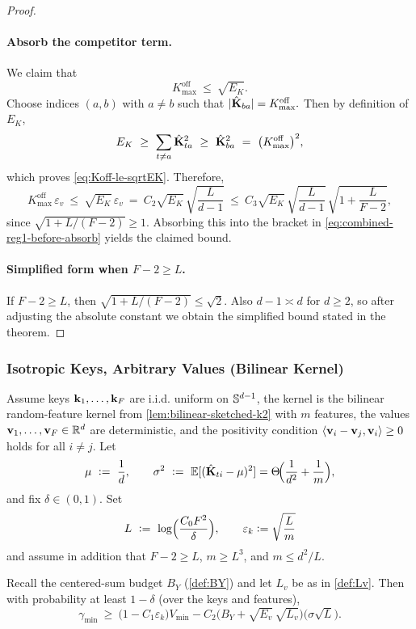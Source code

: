 \begin{proof}
\paragraph{Absorb the competitor term.}
We claim that
\begin{equation}
K_{\max}^{\mathrm{off}}\ \le\ \sqrt{E_K}.
\label{eq:Koff-le-sqrtEK}
\end{equation}
Choose indices \((a,b)\) with \(a\neq b\) such that
\(
|\hat{\mathbf{K}}_{ba}|=K_{\max}^{\mathrm{off}}.
\)
Then by definition of \(E_{K}\),
\[
E_{K}
\ \ge\
\sum_{t\neq a}\hat{\mathbf{K}}_{ta}^2
\ \ge\
\hat{\mathbf{K}}_{ba}^2
\ =\
\big(K_{\max}^{\mathrm{off}}\big)^2,
\]
which proves \eqref{eq:Koff-le-sqrtEK}.
Therefore,
\[
K_{\max}^{\mathrm{off}}\,\varepsilon_{v}
\ \le\
\sqrt{E_K}\,\varepsilon_{v}
\ =\
C_{2}\sqrt{E_K}\,\sqrt{\frac{L}{d-1}}
\ \le\
C_{3}\sqrt{E_K}\,\sqrt{\frac{L}{d-1}}\,\sqrt{1+\frac{L}{F-2}},
\]
since \(\sqrt{1+L/(F-2)}\ge 1\).
Absorbing this into the bracket in \eqref{eq:combined-reg1-before-absorb} yields the claimed bound.

\paragraph{Simplified form when \(F-2\ge L\).}
If \(F-2\ge L\), then \(\sqrt{1+L/(F-2)}\le \sqrt{2}\).
Also \(d-1\asymp d\) for \(d\ge 2\), so after adjusting the absolute constant we obtain the simplified bound stated in the theorem.
\end{proof}


\subsubsection{Isotropic Keys, Arbitrary Values (Bilinear Kernel)}
\label{app:combined-regime2}
\label{app:theory:margin_bounds:rkav}
\label{app:theory:proof:isok-bilinear-hp}

\begin{theorem}\label{thm:combined-rkav}
Assume keys \({\mathbf{k}}_{1},\dots,{\mathbf{k}}_{F}\) are i.i.d. uniform on \(\mathbb{S}^{d-1}\), the kernel is the bilinear random-feature kernel from \cref{lem:bilinear-sketched-k2} with $m$ features, the values \({\mathbf{v}}_{1},\dots,{\mathbf{v}}_{F}\in\mathbb{R}^d\) are deterministic, and the positivity condition \(\langle {{\mathbf{v}}_{i}-{\mathbf{v}}_j}, {{\mathbf{v}}_i} \rangle\ge 0\) holds for all \(i\neq j\).
Let
\[
\mu\ \defeq\ \frac{1}{d},
\qquad
\sigma^2\ \defeq\ \E[(\hat{\matK}_{ti}-\mu)^2]=\Theta\!\Big(\frac{1}{d^2}+\frac{1}{m}\Big),
\]
and fix \(\delta\in(0,1)\). Set
\[
L\ \vcentcolon=\ \log\!\Big(\frac{C_{0} F^2}{\delta}\Big), \qquad \varepsilon_k \vcentcolon= \sqrt{\frac{L}{m}}
\]
and assume in addition that \(F-2\ge L\), \(m \geq L^3\), and \(m\le d^2/L\).

Recall the centered-sum budget \(B_Y\) (\cref{def:BY}) and let \(L_v\) be as in \cref{def:Lv}.
Then with probability at least \(1-\delta\) (over the keys and features),
\begin{equation}
\gamma_{\min}
\ \ge\
\Big(1-C_{1}\varepsilon_k\Big)V_{\min}
-
C_{2}\Big(B_{Y}+\sqrt{E_v}\,\sqrt{L_v}\Big)
\Big(\sigma\sqrt{L}\Big).
\label{eq:app:rkav:thm}
\end{equation}
\end{theorem}

